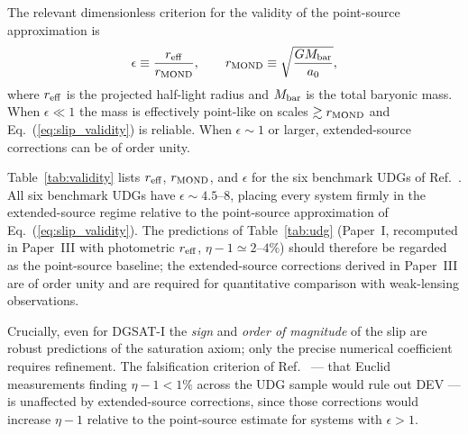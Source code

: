 \documentclass[aps,prd,reprint,floatfix,nofootinbib,superscriptaddress]{revtex4-2}
\newcommand{\aO}{a_0}
\begin{document}
The relevant dimensionless criterion for the validity of the
point-source approximation is
\begin{equation}
  \epsilon \equiv \frac{r_{\rm eff}}{r_{\rm MOND}},
  \qquad
  r_{\rm MOND} \equiv \sqrt{\frac{GM_{\rm bar}}{\aO}},
  \label{eq:epsilon}
\end{equation}
where $r_{\rm eff}$ is the projected half-light radius and
$M_{\rm bar}$ is the total baryonic mass. When $\epsilon \ll 1$
the mass is effectively point-like on scales $\gtrsim r_{\rm MOND}$
and Eq.~(\ref{eq:slip_validity}) is reliable. When $\epsilon \sim 1$
or larger, extended-source corrections can be of order unity.

Table~\ref{tab:validity} lists $r_{\rm eff}$, $r_{\rm MOND}$, and
$\epsilon$ for the six benchmark UDGs of Ref.~\cite{Mendes2026}.
All six benchmark UDGs have $\epsilon \sim 4.5$--$8$, placing every
system firmly in the extended-source regime relative to the
point-source approximation of Eq.~(\ref{eq:slip_validity}). The
predictions of Table~\ref{tab:udg} (Paper~I, recomputed in
Paper~III with photometric $r_{\rm eff}$, $\eta-1 \simeq 2$--$4\%$)
should therefore be regarded as the point-source baseline; the
extended-source corrections derived in Paper~III are of order unity
and are required for quantitative comparison with weak-lensing
observations.

Crucially, even for DGSAT-I the \emph{sign} and \emph{order of
magnitude} of the slip are robust predictions of the saturation
axiom; only the precise numerical coefficient requires refinement.
The falsification criterion of Ref.~\cite{Mendes2026} — that
Euclid measurements finding $\eta - 1 < 1\%$ across the UDG sample
would rule out DEV — is unaffected by extended-source corrections,
since those corrections would increase $\eta - 1$ relative to the
point-source estimate for systems with $\epsilon > 1$.
\end{document}
